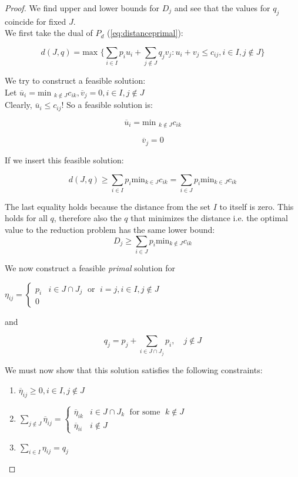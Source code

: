 \begin{proof}
We find upper and lower bounds for $D_j$ and see that the values for $q_j$ coincide
for fixed $J$.\\

We first take the dual of $P_d$ (\ref{eq:distanceprimal}):

\[
d(J, q) = \text{max  } \{\sum_{i\in I} p_i u_i + \sum_{j\notin J} q_jv_j : u_i+v_j \leq c_{ij}, i\in I, j\notin J \}
\]

We try to construct a feasible solution:\\
Let $\overline{u}_i = \text{min  }_{k\notin J} c_{ik}, \overline{v}_j=0, i\in I, j\notin J$\\
Clearly, $\overline{u}_i \leq c_{ij}$!
So a feasible solution is:

\[
\overline{u}_i  = \text{min  }_{k\notin J} c_{ik}
\]

\[
\overline{v}_j = 0
\]

If we insert this feasible solution:

\[
d(J,q) \geq \sum_{i\in I} p_i \text{min}_{k\in J} c_{ik} = \sum_{i\in J} p_i \text{min}_{k\in J} c_{ik}
\]

The last equality holds because the distance from the set $I$ to itself is zero. This holds for all $q$,
therefore also the $q$ that minimizes the distance i.e. the optimal value to the reduction problem has
the same lower bound:\\

\[
D_j \geq \sum_{i\in J} p_i \text{min}_{k\notin J} c_{ik}
\]

We now construct a feasible \emph{primal} solution for 

\begin{center}
$\eta_{ij} =
\begin{cases}
p_i & i\in J\cap J_j \;\text{ or }\; i=j, i\in I, j\notin J\\
  0 & 
\end{cases}$
\end{center}

and

\[
q_j = p_j + \sum_{i\in J \cap J_j} p_i,\quad j\notin J
\]

We must now show that this solution satisfies the following constraints:\\

\begin{enumerate}
\item $\overline{\eta}_{ij} \geq 0, i \in I, j\notin J$
\item $\sum_{j\notin J} \overline{\eta}_{ij} =
\begin{cases}
\overline{\eta}_{ik} & i\in J\cap J_k \;\text{ for some  }\; k\notin J\\
\overline{\eta}_{ii} & i\notin J
\end{cases}$
\item $\sum_{i\in I} \eta_{ij} = q_j$
\end{enumerate}


\end{proof}
